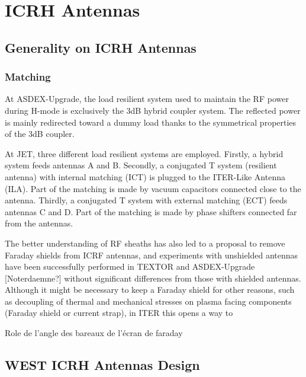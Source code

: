 \section{ICRH Antennas}\label{sec:ICRH_antennas}

\subsection{Generality on ICRH Antennas}
\subsubsection{Matching}

At ASDEX-Upgrade, the load resilient system used to maintain the RF power during H-mode is exclusively the 3dB hybrid coupler system. The reflected power is mainly redirected toward a dummy load thanks to the symmetrical properties of the 3dB coupler.

At JET, three different load resilient systems are employed. Firstly, a hybrid system feeds antennas A and B. Secondly, a conjugated T system (resilient antenna) with internal matching (ICT) is plugged to the ITER-Like Antenna (ILA). Part of the matching is made by vacuum capacitors connected close to the antenna. Thirdly, a conjugated T system with external matching (ECT) feeds antennas C and D. Part of the matching is made by phase shifters connected far from the antennas.

The better understanding of RF sheaths has also led to a proposal to remove Faraday shields from ICRF antennas, and experiments with unshielded antennas have been successfully performed in TEXTOR \cite{nieuwenhove1991, nieuwenhove1992-1} and ASDEX-Upgrade [Noterdaemne?] without significant differences from those with shielded antennas. Although it might be necessary to keep a Faraday shield for other reasons, such as decoupling of thermal and mechanical stresses on plasma facing components (Faraday shield or current strap), in ITER this opens a way to

Role de l'angle des bareaux de l'écran de faraday

\subsection{WEST ICRH Antennas Design}

